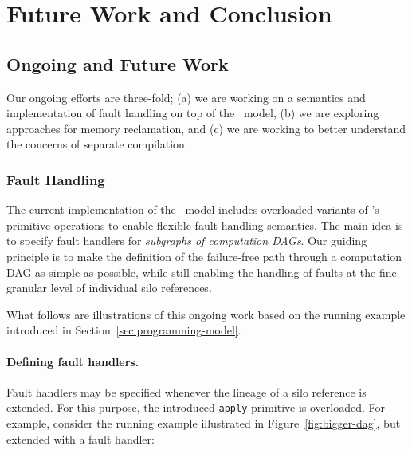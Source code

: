 \documentclass{jfp1}
\begin{document}


\section{Future Work and Conclusion}
\label{sec:conclusion-future-work}

\subsection{Ongoing and Future Work}

Our ongoing efforts are three-fold; (a) we are working on a semantics and implementation
of fault handling on top of the \FP~model, (b) we are exploring approaches for memory
reclamation, and (c) we are working to better understand the concerns of separate compilation.

\subsubsection{Fault Handling}
The current implementation of the \FP~model includes overloaded variants of
\FP's primitive operations to enable flexible fault handling semantics. 
The main idea is to specify fault handlers for {\em subgraphs of computation DAGs}. 
Our guiding principle is to make the definition
of the failure-free path through a computation DAG as simple as possible, while
still enabling the handling of faults at the fine-granular level of individual
silo references.

What follows are illustrations of this ongoing work based on the running example
introduced in Section~\ref{sec:programming-model}.

\paragraph{Defining fault handlers.}

Fault handlers may be specified whenever the lineage of a silo reference is
extended. For this purpose, the introduced \verb|apply|
primitive is overloaded. For example, consider the running example illustrated
in Figure~\ref{fig:bigger-dag}, but extended with a fault handler:
\end{document}
